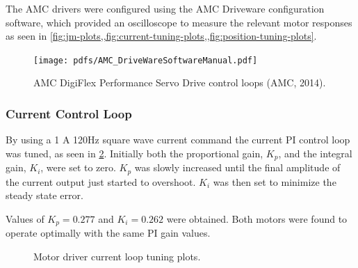 The AMC drivers were configured using the AMC Driveware configuration software, which provided an oscilloscope to measure the relevant motor responses as seen in \cref{fig:jm-plots,,fig:current-tuning-plots,,fig:position-tuning-plots}.

\begin{figure}
\centering
\texttt{[image: pdfs/AMC\_DriveWareSoftwareManual.pdf]} 
\caption{AMC DigiFlex Performance Servo Drive control loops (AMC, 2014).}
\label{fig:AMCControlLoops}
\end{figure}

\subsubsection{Current Control Loop}

By using a 1 A 120Hz square wave current command the current PI control loop was tuned, as seen in \cref{fig:current-tuning-plots}. Initially both  the proportional gain, $K_p$, and the integral gain, $K_i$, were set to zero. $K_p$ was slowly increased until the final amplitude of the current output just started to overshoot. $K_i$ was then set to minimize the steady state error. 

Values of $K_p = 0.277$ and $K_i = 0.262$ were obtained. Both motors were found to operate optimally with the same PI gain values.

\begin{figure}
\centering
{}
\caption{Motor driver current loop tuning plots.}
\label{fig:current-tuning-plots}
\end{figure}

